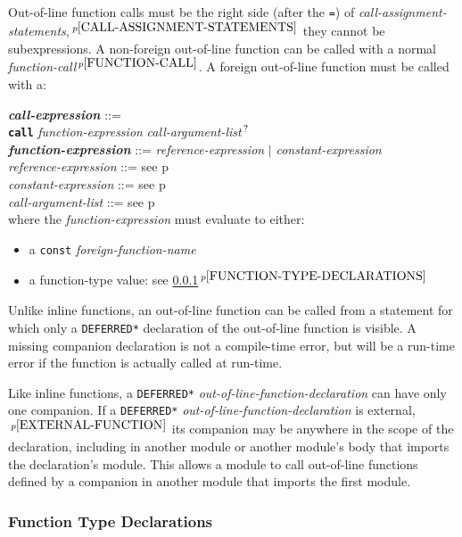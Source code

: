 \documentclass[12pt]{article}
\newcommand{\QMARK}{{$^{\,\mbox{\footnotesize ?}}$}}
\newcommand{\ttkey}[1]{{\tt \bfseries #1}}
\newcommand{\emkey}[1]{{\em \bfseries #1}}
\newcommand{\itemref}[1]{\ref{#1}$\,^{p\pageref{#1}}$}
\newcommand{\pagref}[1]{p\pageref{#1}}
\newcommand{\pagnote}[1]{$\,^{p\pageref{#1}}$}
\newenvironment{indpar}[1][0.3in]%
	{\begin{list}{}%
		     {\setlength{\itemsep}{0in}%
		      \setlength{\topsep}{0in}%
		      \setlength{\parsep}{1ex}%
		      \setlength{\labelwidth}{#1}%
		      \setlength{\leftmargin}{#1}%
		      \addtolength{\leftmargin}{\labelsep}}%
	 \item}%
	{\end{list}}
\begin{document}
Out-of-line function calls must be the right side (after the {\tt =})
of {\em call-assignment-state\-ments},\pagnote{CALL-ASSIGNMENT-STATEMENTS}
they cannot be subexpressions.
A non-foreign out-of-line function can be called with a normal
{\em function-call}\pagnote{FUNCTION-CALL}. A foreign
out-of-line function must be called with a:
\begin{indpar}
\emkey{call-expression}\label{CALL-EXPRESSION} ::= \\
\hspace*{0.25in}
	\ttkey{call} {\em function-expression}
	     {\em call-argument-list}\QMARK{}
\\[0.5ex]
\emkey{function-expression} ::= {\em reference-expression} $|$
                                {\em constant-expression}
\\[0.5ex]
{\em reference-expression} ::= see \pagref{REFERENCE-EXPRESSION}
\\[0.5ex]
{\em constant-expression} ::= see \pagref{CONSTANT-EXPRESSION}
\\[0.5ex]
{\em call-argument-list} ::= see \pagref{CALL-ARGUMENT-LIST}
\\[2ex]
where the {\em function-expression} must evaluate to either:
\begin{itemize}
\item a {\tt const} {\em foreign-function-name}
\item a function-type value: see \itemref{FUNCTION-TYPE-DECLARATIONS}
\end{itemize}
\end{indpar}

Unlike inline functions, an out-of-line function can
be called from a statement for which only a {\tt *DEFERRED*} declaration
of the out-of-line function is visible.  A missing companion
declaration is not a compile-time error, but will be a
run-time error if the function is actually called at run-time.

Like inline functions, a {\tt *DEFERRED*} {\em out-of-line-function-declaration}
can have only one companion.
If\label{OUT-OF-LINE-EXTERNAL-COMPANION}
a {\tt *DEFERRED*} {\em out-of-line-function-declaration}
is external,\pagnote{EXTERNAL-FUNCTION}
its companion may be anywhere in the scope of the declaration,
including in another module or another module's body that imports
the declaration's module.
This allows a module to call out-of-line functions defined by
a companion in another module that imports the first module.

\subsubsection{Function Type Declarations}
\label{FUNCTION-TYPE-DECLARATIONS}
\end{document}
